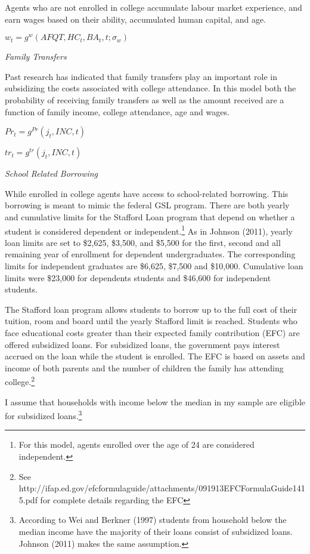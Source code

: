 \documentclass[letterpaper,12pt]{article}
\begin{document}
Agents who are not enrolled in college accumulate labour market experience, and earn wages based on their ability, accumulated human capital, and age. 

$w_t = g^w(AFQT, HC_t, BA_t, t; \sigma_w)$

\noindent \emph{Family Transfers}

Past research has indicated that family transfers play an important role in subsidizing the costs associated with college attendance. In this model both the probability of receiving family transfers as well as the amount received are a function of family income, college attendance, age and wages. 

$Pr_t = g^{Pr}(j_t, INC, t)$

$tr_t = g^{tr}(j_t, INC, t)$

\noindent \emph{School Related Borrowing}

While enrolled in college agents have access to school-related borrowing. This borrowing is meant to mimic the federal GSL program. There are both yearly and cumulative limits for the Stafford Loan program that depend on whether a student is considered dependent or independent.\footnote{For this model, agents enrolled over the age of 24 are considered independent.} As in Johnson (2011), yearly loan limits are set to \$2,625, \$3,500, and \$5,500 for the first, second and all remaining year of enrollment for dependent undergraduates. The corresponding limits for independent graduates are \$6,625, \$7,500 and \$10,000. Cumulative loan limits were \$23,000 for dependents students and \$46,600 for independent students.

The Stafford loan program allows students to borrow up to the full cost of their tuition, room and board until the yearly Stafford limit is reached. Students who face educational costs greater than their expected family contribution (EFC) are offered subsidized loans. For subsidized loans, the government pays interest accrued on the loan while the student is enrolled. The EFC is based on assets and income of both parents and the number of children the family has attending college.\footnote{See http://ifap.ed.gov/efcformulaguide/attachments/091913EFCFormulaGuide1415.pdf for complete details regarding the EFC}

I assume that households with income below the median in my sample are eligible for subsidized loans.\footnote{According to Wei and Berkner (1997) students from household below the median income have the majority of their loans consist of subsidized loans. Johnson (2011) makes the same assumption.}
\end{document}
